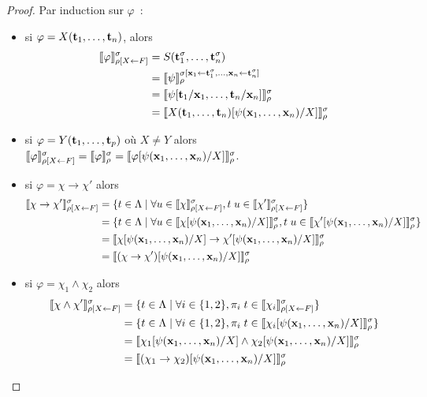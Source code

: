 \documentclass{article}
\begin{document}
\begin{proof}
  Par induction sur $\varphi$~:
  \begin{itemize}
  \item si $\varphi = X(\mathbf{t}_1,\ldots,\mathbf{t}_n)$, alors
    \begin{align*}
      \llbracket \varphi \rrbracket_{\rho[X\leftarrow F]}^\sigma &= S(\mathbf{t}_1^\sigma,\ldots,\mathbf{t}_n^\sigma) \\
      &= \llbracket \psi \rrbracket_\rho^{\sigma[\mathbf{x}_1\leftarrow \mathbf{t}_1^\sigma,\ldots,\mathbf{x}_n\leftarrow \mathbf{t}_n^\sigma]} \\
      &= \llbracket \psi[\mathbf{t}_1/\mathbf{x}_1,\ldots,\mathbf{t}_n/\mathbf{x}_n] \rrbracket_\rho^\sigma\\
      &= \llbracket X(\mathbf{t}_1,\ldots,\mathbf{t}_n)[\psi(\mathbf{x}_1,\ldots,\mathbf{x}_n)/X] \rrbracket_\rho^\sigma
    \end{align*}
  \item si $\varphi = Y(\mathbf{t}_1,\ldots,\mathbf{t}_p)$ où $X\neq Y$ alors $\llbracket \varphi \rrbracket_{\rho[X\leftarrow F]}^\sigma = \llbracket \varphi \rrbracket_\rho^\sigma = \llbracket \varphi[\psi(\mathbf{x}_1,\ldots,\mathbf{x}_n)/X] \rrbracket_\rho^\sigma$.
  \item si $\varphi = \chi \to \chi'$ alors
    \begin{align*}
      \llbracket \chi\to\chi' \rrbracket_{\rho[X\leftarrow F]}^\sigma &= \{t\in\Lambda\mid \forall u \in \llbracket \chi \rrbracket_{\rho[X\leftarrow F]}^\sigma, t\;u\in \llbracket \chi' \rrbracket_{\rho[X\leftarrow F]}^\sigma\}\\
      &= \{t\in\Lambda\mid \forall u \in \llbracket \chi[\psi(\mathbf{x}_1,\ldots,\mathbf{x}_n)/X] \rrbracket_\rho^\sigma, t\;u\in\llbracket \chi'[\psi(\mathbf{x}_1,\ldots,\mathbf{x}_n)/X] \rrbracket_\rho^\sigma\}\\
      &= \llbracket \chi[\psi(\mathbf{x}_1,\ldots,\mathbf{x}_n)/X] \to \chi'[\psi(\mathbf{x}_1,\ldots,\mathbf{x}_n)/X] \rrbracket_\rho^\sigma\\
      &= \llbracket (\chi\to\chi')[\psi(\mathbf{x}_1,\ldots,\mathbf{x}_n)/X] \rrbracket_\rho^\sigma
    \end{align*}
  \item si $\varphi = \chi_1\land\chi_2$ alors
    \begin{align*}
      \trad{\chi\land\chi'}_{\rho[X\leftarrow F]}^\sigma &= \{t\in\Lambda\mid \forall i \in \{1,2\}, \pi_i\;t\in \trad{\chi_i}_{\rho[X\leftarrow F]}^\sigma\}\\
      &= \{t\in\Lambda\mid \forall i \in \{1,2\}, \pi_i\;t\in\trad{\chi_i[\psi(\bx_1,\ldots,\bx_n)/X]}_\rho^\sigma\}\\
      &= \trad{\chi_1[\psi(\bx_1,\ldots,\bx_n)/X] \land \chi_2[\psi(\bx_1,\ldots,\bx_n)/X]}_\rho^\sigma\\
      &= \trad{(\chi_1\to\chi_2)[\psi(\bx_1,\ldots,\bx_n)/X]}_\rho^\sigma

\end{align*}
\end{itemize}
\end{proof}
\end{document}
